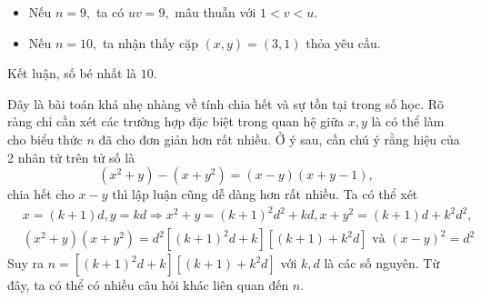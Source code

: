 \begin{gbtt}
{\begin{enumerate}[a,]
\begin{itemize}
    \item {}Nếu $n=9,$ ta có $uv=9,$ mâu thuẫn với $1<v<u.$
    \item {}Nếu $n=10,$ ta nhận thấy cặp $(x,y)=(3,1)$ thỏa yêu cầu.
\end{itemize}
Kết luận, số  bé nhất là $10.$
\end{enumerate}}
\begin{luuy}
Đây là bài toán khá nhẹ nhàng về tính chia hết và sự tồn tại trong số học. Rõ ràng chỉ cần xét các trường hợp đặc biệt trong quan hệ giữa $x, y$ là có thể làm cho biểu thức $n$ đã cho đơn giản hơn rất nhiều. Ở ý sau, cần chú ý rằng hiệu của 2 nhân tử trên tử số là
$$\left(x^{2}+y\right)-\left(x+y^{2}\right)=(x-y)(x+y-1),$$ chia hết cho $x-y$
thì lập luận cũng dễ dàng hơn rất nhiều. Ta có thể xét
\begin{align*}
    &x=(k+1) d, y=k d \Rightarrow x^{2}+y=(k+1)^{2} d^{2}+k d, x+y^{2}=(k+1) d+k^{2} d^{2},\\
    &\left(x^{2}+y\right)\left(x+y^{2}\right)=d^{2}\left[(k+1)^{2} d+k\right]\left[(k+1)+k^{2} d\right] \text { và }(x-y)^{2}=d^{2}
\end{align*}
Suy ra $n=\left[(k+1)^{2} d+k\right]\left[(k+1)+k^{2} d\right]$ với $k, d$ là các số nguyên. Từ đây, ta có thể có nhiều câu hỏi khác liên quan đến $n$.
\end{luuy}
\end{gbtt}

